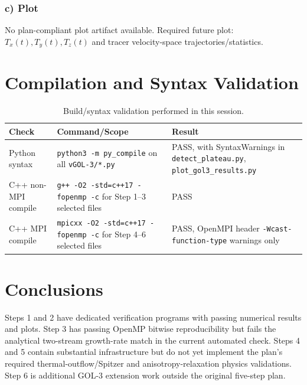 \documentclass[11pt,a4paper]{article}
\begin{document}
\subsubsection*{c) Plot}
No plan-compliant plot artifact available. Required future plot: $T_x(t),T_y(t),T_z(t)$ and tracer velocity-space trajectories/statistics.

\section{Compilation and Syntax Validation}

\begin{table}[H]
\centering
\begin{tabular}{p{}p{}p{}}
\toprule
Check & Command/Scope & Result \\
\midrule
Python syntax & \texttt{python3 -m py\_compile} on all \texttt{vGOL-3/*.py} & PASS, with SyntaxWarnings in \texttt{detect\_plateau.py}, \texttt{plot\_gol3\_results.py} \\
C++ non-MPI compile & \texttt{g++ -O2 -std=c++17 -fopenmp -c} for Step 1--3 selected files & PASS \\
C++ MPI compile & \texttt{mpicxx -O2 -std=c++17 -fopenmp -c} for Step 4--6 selected files & PASS, OpenMPI header \texttt{-Wcast-function-type} warnings only \\
\bottomrule
\end{tabular}
\caption{Build/syntax validation performed in this session.}
\end{table}

\section{Conclusions}
Steps 1 and 2 have dedicated verification programs with passing numerical results and plots. Step 3 has passing OpenMP bitwise reproducibility but fails the analytical two-stream growth-rate match in the current automated check. Steps 4 and 5 contain substantial infrastructure but do not yet implement the plan's required thermal-outflow/Spitzer and anisotropy-relaxation physics validations. Step 6 is additional GOL-3 extension work outside the original five-step plan.
\end{document}
